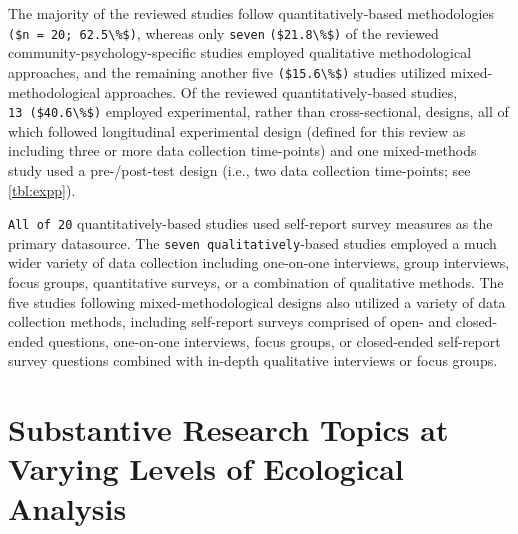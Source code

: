 \documentclass[11pt,]{tufte-book}
\begin{document}
The majority of the reviewed studies follow quantitatively-based
methodologies \texttt{(\$n\ =\ 20;\ 62.5\textbackslash{}\%\$)}, whereas
only \texttt{seven} \texttt{(\$21.8\textbackslash{}\%\$)} of the
reviewed community-psychology-specific studies employed qualitative
methodological approaches, and the remaining another five
\texttt{(\$15.6\textbackslash{}\%\$)} studies utilized
mixed-methodological approaches. Of the reviewed quantitatively-based
studies, \texttt{13\ (\$40.6\textbackslash{}\%\$)} employed
experimental, rather than cross-sectional, designs, all of which
followed longitudinal experimental design (defined for this review as
including three or more data collection time-points) and one
mixed-methods study used a pre-/post-test design (i.e., two data
collection time-points; see \cref{tbl:expp}).

\texttt{All\ of\ 20} quantitatively-based studies used self-report
survey measures as the primary datasource. The
\texttt{seven\ qualitatively}-based studies employed a much wider
variety of data collection including one-on-one interviews, group
interviews, focus groups, quantitative surveys, or a combination of
qualitative methods. The five studies following mixed-methodological
designs also utilized a variety of data collection methods, including
self-report surveys comprised of open- and closed-ended questions,
one-on-one interviews, focus groups, or closed-ended self-report survey
questions combined with in-depth qualitative interviews or focus groups.

\section{Substantive Research Topics at Varying Levels of Ecological
Analysis}\label{substantive-research-topics-at-varying-levels-of-ecological-analysis}
\end{document}

